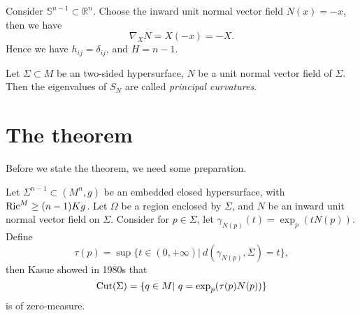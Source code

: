 \begin{eg}
    Consider $\mathbb{S}^{n-1}\subset\mathbb{R}^n$.
    Choose the inward unit normal vector field $N(x)=-x$, then we have
    \[\nabla_XN=X(-x)=-X.\]
    Hence we have $h_{ij}=\delta_{ij}$, and $H=n-1$.
\end{eg}

\begin{defn}
    Let $\Sigma\subset M$ be an two-sided hypersurface, $N$ be a unit normal vector field of $\Sigma$.
    Then the eigenvalues of $S_N$ are called \emph{principal curvatures}.
\end{defn}

\section{The theorem}

Before we state the theorem, we need some preparation.

Let $\Sigma^{n-1}\subset(M^n,g)$ be an embedded closed hypersurface, with $\operatorname{Ric}^M\geq(n-1)Kg$.
Let $\Omega$ be a region enclosed by $\Sigma$, and $N$ be an inward unit normal vector field on $\Sigma$.
Consider for $p\in\Sigma$, let $\gamma_{N(p)}(t)=\exp_p(tN(p))$.
Define
\[\tau(p)=\sup\{t\in(0,+\infty)|\ d(\gamma_{N(p)},\Sigma)=t\},\]
then Kasue showed in 1980s that
\[\Cut(\Sigma)=\{q\in M|\ q=\exp_p(\tau(p)N(p))\}\]
is of zero-measure.

